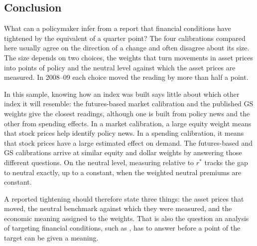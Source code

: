 \documentclass[11pt]{article}
\begin{document}
\subsection{Conclusion}\label{sec:conclusion}
What can a policymaker infer from a report that financial conditions have tightened by the equivalent of a quarter point? The four calibrations compared here usually agree on the direction of a change and often disagree about its size. The size depends on two choices, the weights that turn movements in asset prices into points of policy and the neutral level against which the asset prices are measured. In 2008--09 each choice moved the reading by more than half a point.

In this sample, knowing how an index was built says little about which other index it will resemble: the futures-based market calibration and the published GS weights give the closest readings, although one is built from policy news and the other from spending effects. In a market calibration, a large equity weight means that stock prices help identify policy news. In a spending calibration, it means that stock prices have a large estimated effect on demand. The futures-based and GS calibrations arrive at similar equity and dollar weights by answering those different questions. On the neutral level, measuring relative to $r^*$ tracks the gap to neutral exactly, up to a constant, when the weighted neutral premiums are constant.

A reported tightening should therefore state three things: the asset prices that moved, the neutral benchmark against which they were measured, and the economic meaning assigned to the weights. That is also the question an analysis of targeting financial conditions, such as \citet{caballero2026b}, has to answer before a point of the target can be given a meaning.



\end{document}
